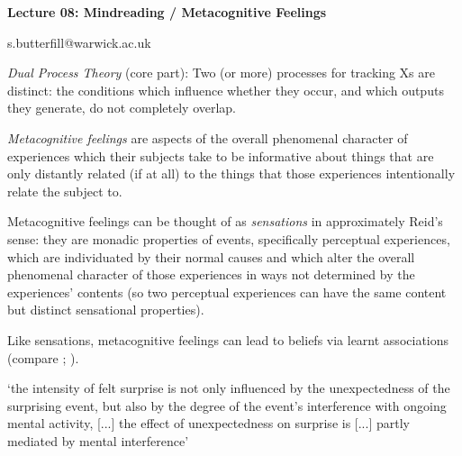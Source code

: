 \documentclass[12pt]{extarticle}
\date{}
\makeatletter
\def \ititle {Philosophical Psychology}
\def \iemail{s.butterfill@warwick.ac.uk}
\makeatother
\begin{document}
\begin{multicols*}{3}

\setlength\footnotesep{1em}












\def \ititle {Lecture 08: Mindreading / Metacognitive Feelings}

\begin{center}

{\Large

\textbf{\ititle}

}



\iemail %

\end{center}



\emph{Dual Process Theory} (core part):
Two (or more) processes for tracking Xs are distinct:
the conditions which influence whether they occur,
and which outputs they generate,
do not completely overlap.




\emph{Metacognitive feelings}
are aspects of the overall phenomenal character of experiences
which their subjects take to be informative about things that are only
distantly related (if at all) to the things that those experiences
intentionally relate the subject to.

Metacognitive feelings can be thought of as \emph{sensations} in approximately Reid’s sense: they are
monadic properties of events, specifically perceptual experiences, which are individuated by
their normal causes and which alter the overall phenomenal character of those experiences in
ways not determined by the experiences’ contents (so two perceptual experiences can have the
same content but distinct sensational properties).

Like sensations, metacognitive feelings  can lead to beliefs via learnt associations (compare \citealp[Essay~II, Chap.~16, p.~228]{Reid:1785cj};
\citealp[Chap.~VI sect.~III, pp.~164–5]{Reid:1785nz}).

‘the intensity of felt surprise is not only influenced by the unexpectedness of the surprising event, but also by the degree of the event’s interference with ongoing mental activity, [...]
the effect of unexpectedness on surprise is [...] partly mediated by mental interference’
\citep[p.~271]{reisenzein2000subjective}


\end{multicols*}
\end{document}
